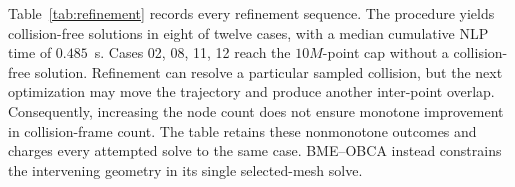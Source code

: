 Table~\ref{tab:refinement} records every refinement sequence. The procedure yields collision-free solutions in eight of twelve cases, with a median cumulative NLP time of $0.485$~s. Cases 02, 08, 11, 12 reach the $10M$-point cap without a collision-free solution. Refinement can resolve a particular sampled collision, but the next optimization may move the trajectory and produce another inter-point overlap. Consequently, increasing the node count does not ensure monotone improvement in collision-frame count. The table retains these nonmonotone outcomes and charges every attempted solve to the same case. BME--OBCA instead constrains the intervening geometry in its single selected-mesh solve.
